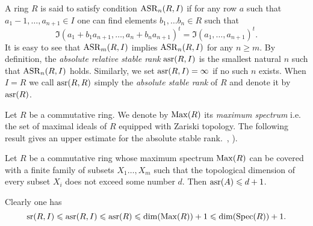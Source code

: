A ring $R$ is said to satisfy condition $\operatorname{ASR}_{n}(R,I)$ if for any row $a$ such that $a_1-1,\ldots,a_{n+1}\in I$ one can find elements $b_1,\ldots b_n\in R$ such that
\[ \mathfrak{I}(a_1+b_1a_{n+1},\ldots,a_n+b_na_{n+1})^t = \mathfrak{I}(a_1,\ldots,a_{n+1})^t. \]
It is easy to see that $\operatorname{ASR}_m(R,I)$ implies $\operatorname{ASR}_n(R,I)$ for any $n\geqslant m$. 
By definition, the {\it absolute relative stable rank} $\operatorname{asr}(R,I)$ is the smallest natural $n$ such that $\operatorname{ASR}_n(R, I)$ holds. Similarly, we set $\operatorname{asr}(R,I)=\infty$ if no such $n$ exists. When $I=R$ we call $\operatorname{asr}(R, R)$ simply the {\it absolute stable rank} of $R$ and denote it by $\operatorname{asr}(R)$.

Let $R$ be a commutative ring. We denote by $\operatorname{Max}(R)$ its {\it maximum spectrum} i.e. the set of maximal ideals of $R$ equipped with Zariski topology.
The following result gives an upper estimate for the absolute stable rank.~\cite[Theorem~2.3]{EO}, \cite[Theorem~3.7]{MKV}).
\begin{thm}
Let $R$ be a commutative ring whose maximum spectrum $\operatorname{Max}(R)$ can be covered with a finite family of subsets $X_1\ldots, X_m$ such that the topological dimension of every subset $X_i$ does not exceed some number $d$. Then $\operatorname{asr}(A)\leqslant d+1$.
\end{thm}
Clearly one has
\[ \operatorname{sr}(R,I)\leqslant\operatorname{asr}(R,I)\leqslant\operatorname{asr}(R)\leqslant \dim(\operatorname{Max}(R))+1\leqslant\dim(\operatorname{Spec}(R))+1. \]